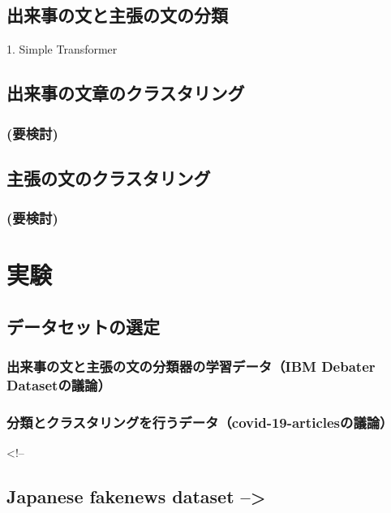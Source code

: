 \documentclass[12pt,a4j]{jreport}
\begin{document}
\section{出来事の文と主張の文の分類}
    1. Simple Transformer
\section{出来事の文章のクラスタリング}
    \subsection{(要検討)}
\section{主張の文のクラスタリング}
    \subsection{(要検討)}



\chapter{実験}

\section{データセットの選定}
    \subsection{出来事の文と主張の文の分類器の学習データ（IBM Debater Datasetの議論）}
    \subsection{分類とクラスタリングを行うデータ（covid-19-articlesの議論）}
        <!-- \section{Japanese fakenews dataset -->}
\end{document}

